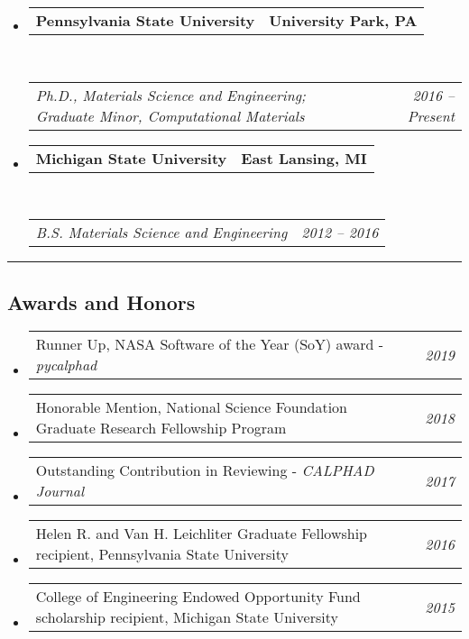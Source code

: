 \documentclass[10pt,letterpaper]{article}
\makeatletter
\newcommand{\headerrow}[2]
{\begin{tabular*}{\linewidth}{l@{\extracolsep{\fill}}r}
  #1 &
  #2 \\
\end{tabular*}}
\makeatother
\begin{document}
\begin{itemize}
  \parskip=0.1em

  \item
  \headerrow
    {\textbf{Pennsylvania State University}}
    {\textbf{University Park, PA}}
  \\
  \headerrow
    {\emph{Ph.D., Materials Science and Engineering; Graduate Minor, Computational Materials}}
    {\emph{2016 -- Present}}


  \item
  \headerrow
    {\textbf{Michigan State University}}
    {\textbf{East Lansing, MI}}
  \\
  \headerrow
    {\emph{B.S. Materials Science and Engineering}}
    {\emph{2012 -- 2016}}

\end{itemize}

\hrule
\vspace{-0.6em}
\subsection*{Awards and Honors}

\begin{itemize}
  \parskip=0.1em

  \item
  \headerrow
       {Runner Up, NASA Software of the Year (SoY) award - \emph{pycalphad}}
       {\emph{2019}}
  \item
  \headerrow
       {Honorable Mention, National Science Foundation Graduate Research Fellowship Program}
       {\emph{2018}}
  \item
  \headerrow
    {Outstanding Contribution in Reviewing - \emph{CALPHAD Journal}}
    {\emph{2017}}
  \item
  \headerrow
    {Helen R. and Van H. Leichliter Graduate Fellowship recipient, Pennsylvania State University} {\emph{2016}}
  \item
  \headerrow
    {College of Engineering Endowed Opportunity Fund scholarship recipient, Michigan State University} {\emph{2015}}

\end{itemize}
\end{document}
